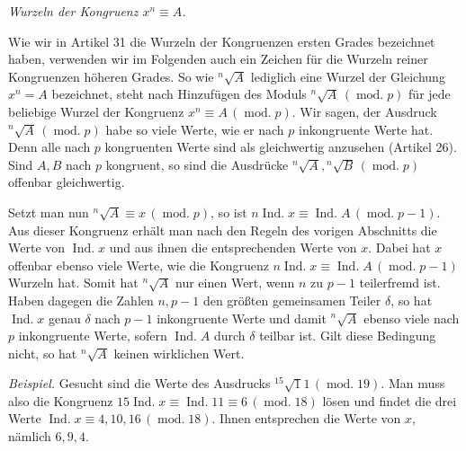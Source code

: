 \begin{center}\emph{Wurzeln der Kongruenz $x^n\equiv A$.}\end{center}

Wie wir in Artikel 31 die Wurzeln der Kongruenzen ersten Grades bezeichnet haben, verwenden wir im Folgenden auch ein Zeichen für die Wurzeln reiner Kongruenzen höheren Grades. So wie ${}^{n}\!\surd A$ lediglich eine Wurzel der Gleichung $x^n=A$ bezeichnet, steht nach Hinzufügen des Moduls ${}^{n}\!\surd A\,(\operatorname{mod.}p)$ für jede beliebige Wurzel der Kongruenz $x^n\equiv A\,(\operatorname{mod.}p)$. Wir sagen, der Ausdruck ${}^{n}\!\surd A\,(\operatorname{mod.}p)$ habe so viele Werte, wie er nach $p$ inkongruente Werte hat. Denn alle nach $p$
kongruenten Werte sind als gleichwertig anzusehen (Artikel 26). Sind $A,B$ nach $p$ kongruent, so sind die Ausdrücke ${}^{n}\!\surd A,{}^{n}\!\surd B\,(\operatorname{mod.}p)$ offenbar gleichwertig.

Setzt man nun ${}^{n}\!\surd A\equiv x\,(\operatorname{mod.}p)$, so ist $n\operatorname{Ind.}x\equiv\operatorname{Ind.}A\,(\operatorname{mod.}p-1)$. Aus dieser Kongruenz erhält man nach den Regeln des vorigen Abschnitts die Werte von $\operatorname{Ind.}x$ und aus ihnen die entsprechenden Werte von $x$. Dabei hat $x$ offenbar ebenso viele Werte, wie die Kongruenz $n\operatorname{Ind.}x\equiv\operatorname{Ind.}A\,(\operatorname{mod.}p-1)$ Wurzeln hat. Somit hat ${}^{n}\!\surd A$ nur einen Wert, wenn $n$ zu $p-1$ teilerfremd ist. Haben dagegen die Zahlen $n,p-1$ den größten gemeinsamen Teiler $\delta$, so hat $\operatorname{Ind.}x$ genau $\delta$ nach $p-1$ inkongruente Werte und damit ${}^{n}\!\surd A$ ebenso viele nach $p$ inkongruente Werte, sofern $\operatorname{Ind.}A$ durch $\delta$ teilbar ist. Gilt diese Bedingung nicht, so hat ${}^{n}\!\surd A$ keinen wirklichen Wert.

\emph{Beispiel.} Gesucht sind die Werte des Ausdrucks ${}^{15}\!\surd11\,(\operatorname{mod.}19)$. Man muss also die Kongruenz $15\operatorname{Ind.}x\equiv\operatorname{Ind.}11\equiv6\,(\operatorname{mod.}18)$ lösen und findet die drei Werte $\operatorname{Ind.}x\equiv4,10,16\,(\operatorname{mod.}18)$. Ihnen entsprechen die Werte von $x$, nämlich $6,9,4$.
